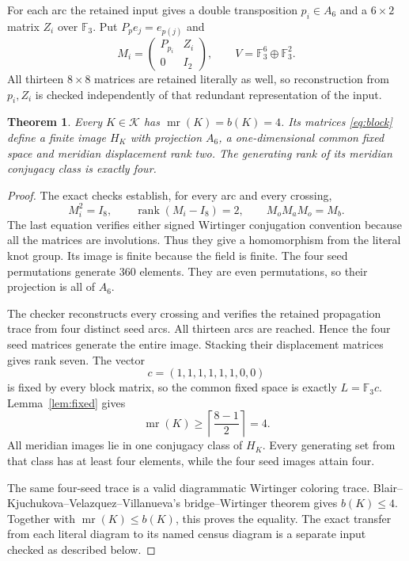 \documentclass[11pt]{article}
\newtheorem{theorem}[lemma]{Theorem}
\newcommand{\F}{\mathbb F}
\newcommand{\mr}{\operatorname{mr}}
\newcommand{\rk}{\operatorname{rank}}
\begin{document}
For each arc the retained input gives a double transposition
$p_i\in A_6$ and a $6\times2$ matrix $Z_i$ over $\F_3$.
Put $P_pe_j=e_{p(j)}$ and
\begin{equation}\label{eq:block}
 M_i=\begin{pmatrix}P_{p_i}&Z_i\\0&I_2\end{pmatrix},
 \qquad V=\F_3^6\oplus\F_3^2.
\end{equation}
All thirteen $8\times8$ matrices are retained literally as well,
so reconstruction from $p_i,Z_i$ is checked independently of that
redundant representation of the input.

\begin{theorem}\label{thm:sharp}
Every $K\in\mathcal K$ has $\mr(K)=b(K)=4$.
Its matrices \eqref{eq:block} define a finite image $H_K$ with
projection $A_6$, a one-dimensional common fixed space and meridian
displacement rank two. The generating rank of its meridian
conjugacy class is exactly four.
\end{theorem}
\begin{proof}
The exact checks establish, for every arc and every crossing,
\[
 M_i^2=I_8,\qquad \rk(M_i-I_8)=2,\qquad M_oM_aM_o=M_b.
\]
The last equation verifies either signed Wirtinger conjugation
convention because all the matrices are involutions. Thus they
give a homomorphism from the literal knot group. Its image is finite
because the field is finite. The four seed permutations generate
$360$ elements. They are even permutations, so their projection is
all of $A_6$.

The checker reconstructs every crossing and verifies the retained
propagation trace from four distinct seed arcs. All thirteen arcs
are reached. Hence the four seed matrices generate the entire image.
Stacking their displacement matrices gives rank seven. The vector
\[
                       c=(1,1,1,1,1,1,0,0)
\]
is fixed by every block matrix, so the common fixed space is
exactly $L=\F_3c$. Lemma~\ref{lem:fixed} gives
\[
                  \mr(K)\ge\left\lceil\frac{8-1}{2}\right\rceil=4.
\]
All meridian images lie in one conjugacy class of $H_K$.
Every generating set from that class has at least four elements,
while the four seed images attain four.

The same four-seed trace is a valid diagrammatic Wirtinger coloring
trace. Blair--Kjuchukova--Velazquez--Villanueva's bridge--Wirtinger
theorem \cite[Definition~1.2 and Theorem~1.3]{bkvv} gives $b(K)\le4$.
Together with $\mr(K)\le b(K)$, this proves the equality.
The exact transfer from each literal diagram to its named census
diagram is a separate input checked as described below.
\end{proof}
\end{document}
